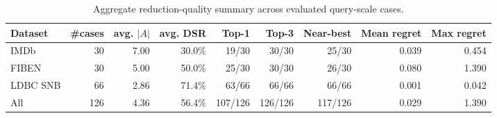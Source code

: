 \begin{table}[t]
\centering
\caption{Aggregate reduction-quality summary across evaluated query-scale cases.}
\label{tab:aggregate-reduction-quality}
\small
\setlength{\tabcolsep}{4pt}
\begin{tabular}{lrrrrrrrr}
\toprule
Dataset & \#cases & avg. $|A|$ & avg. DSR & Top-1 & Top-3 & Near-best & Mean regret & Max regret \\
\midrule
IMDb & 30 & 7.00 & 30.0\% & 19/30 & 30/30 & 25/30 & 0.039 & 0.454 \\
FIBEN & 30 & 5.00 & 50.0\% & 25/30 & 30/30 & 26/30 & 0.080 & 1.390 \\
LDBC SNB & 66 & 2.86 & 71.4\% & 63/66 & 66/66 & 66/66 & 0.001 & 0.042 \\
All & 126 & 4.36 & 56.4\% & 107/126 & 126/126 & 117/126 & 0.029 & 1.390 \\
\bottomrule
\end{tabular}
\end{table}
